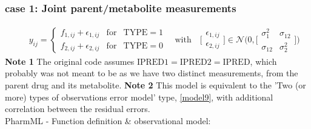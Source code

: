 \documentclass[a4paper,10pt]{article}
\begin{document}
\subsubsection{case 1: Joint  parent/metabolite measurements}
\begin{eqnarray}
&& y_{ij} = \left\{ \begin{array}{rcl}  f_{1,ij} + \epsilon_{1,ij} & \mbox{for}  & \mbox{TYPE}  = 1 \\
f_{2,ij} + \epsilon_{2,ij}    & \mbox{for} & \mbox{TYPE}  = 0  
\end{array}\right. \quad \mbox{with} \quad 
\bigg[ \begin{array}{l}  \epsilon_{1,ij} \\
\epsilon_{2,ij}   \nonumber
\end{array} \bigg]
\in \mathcal{N} 
\Bigg( 0, \bigg[ \begin{array}{ll} \sigma_1^2 & \sigma_{12} \\ \sigma_{12} & \sigma_2^2 \end{array}  \bigg] \Bigg)
\end{eqnarray}
\textbf{Note 1} The original code assumes $\text{IPRED1} = \text{IPRED2} = \text{IPRED}$, which probably was not meant to be as we have two distinct measurements, from the parent drug and its metabolite.
\textbf{Note 2} This model is equivalent to the 'Two (or more) types of observations error model' type, \ref{model9}, with additional correlation between the residual errors.\\
PharmML - Function definition \& observational model:
\end{document}
